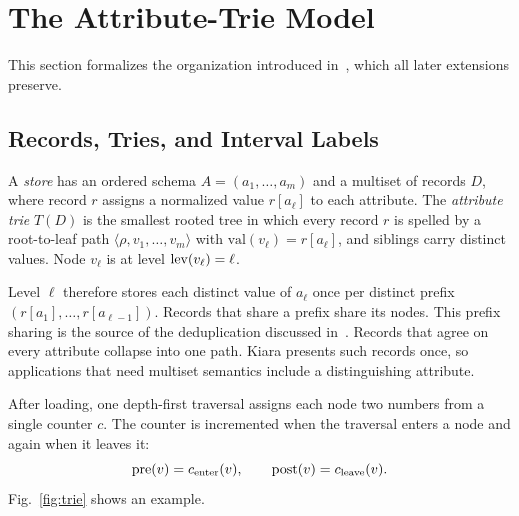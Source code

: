 \section{The Attribute-Trie Model}
\label{sec:model}

This section formalizes the organization introduced in~\cite{kapoor2020efficient}, which all later extensions preserve.

\subsection{Records, Tries, and Interval Labels}

\begin{definition}
A \emph{store} has an ordered schema $A=(a_1,\dots,a_m)$ and a multiset of records $D$, where record $r$ assigns a normalized value $r[a_\ell]$ to each attribute. The \emph{attribute trie} $T(D)$ is the smallest rooted tree in which every record $r$ is spelled by a root-to-leaf path $\langle \rho, v_1,\dots,v_m\rangle$ with $\mathrm{val}(v_\ell)=r[a_\ell]$, and siblings carry distinct values. Node $v_\ell$ is at level $\mathrm{lev}(v_\ell)=\ell$.
\end{definition}

Level $\ell$ therefore stores each distinct value of $a_\ell$ once per distinct prefix $(r[a_1],\dots,r[a_{\ell-1}])$. Records that share a prefix share its nodes. This prefix sharing is the source of the deduplication discussed in~\cite{kapoor2020efficient}. Records that agree on every attribute collapse into one path. Kiara presents such records once, so applications that need multiset semantics include a distinguishing attribute.

After loading, one depth-first traversal assigns each node two numbers from a single counter $c$. The counter is incremented when the traversal enters a node and again when it leaves it:
\begin{equation}
\mathrm{pre}(v) = c_{\mathrm{enter}}(v), \qquad \mathrm{post}(v) = c_{\mathrm{leave}}(v).
\end{equation}
Fig.~\ref{fig:trie} shows an example.

